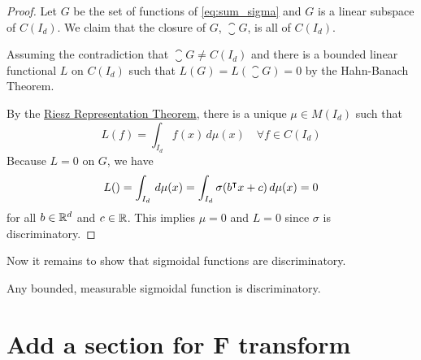 \begin{proof}
    Let $G$ be the set of functions of \eqref{eq:sum_sigma} and $G$ is a linear
    subspace of $C(I_d)$. We claim that the closure of $G$, $\closure{G}$, is
    all of $C(I_d)$.

    Assuming the contradiction that $\closure{G} \not= C(I_d)$ and there is a
    bounded linear functional $L$ on $C(I_d)$ such that $L(G) = L(\closure{G}) =
    0$ by the Hahn-Banach Theorem.

    By the \hyperref[thm:riesz_rep]{Riesz Representation Theorem}, there is a
    unique $\mu \in M(I_d)$ such that
    \begin{equation}
        L(f) = \int_{I_d} f(x) \,d\mu(x) \quad \forall f \in C(I_d)
    \end{equation}
    Because $L = 0$ on $G$, we have
    \begin{equation}
        L() = \int_{I_d} \,d\mu(x) = \int_{I_d} \sigma(b{}^{\intercal} x + c) \,d\mu(x) = 0
    \end{equation}
    for all $b \in \mathbb{R}^d$ and $c \in \mathbb{R}$. This implies $\mu = 0$ and $L = 0$
    since $\sigma$ is discriminatory. 
\end{proof}

Now it remains to show that sigmoidal functions are discriminatory.

\begin{lemma}
    Any bounded, measurable sigmoidal function is discriminatory.
\end{lemma}





\section{Add a section for F transform}

